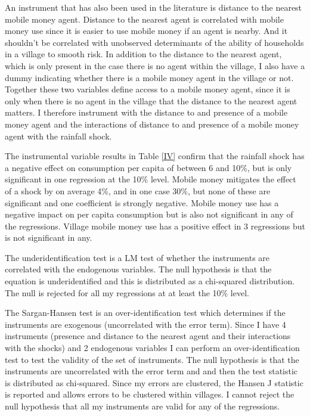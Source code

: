 An instrument that has also been used in the literature is distance to the nearest mobile money agent. Distance to the nearest agent is correlated with mobile money use since it is easier to use mobile money if an agent is nearby. And it shouldn't be correlated with unobserved determinants of the ability of households in a village to smooth risk. In addition to the distance to the nearest agent, which is only present in the case there is no agent within the village, I also have a dummy indicating whether there is a mobile money agent in the village or not. Together these two variables define access to a mobile money agent, since it is only when there is no agent in the village that the distance to the nearest agent matters.   I therefore instrument with the distance to and presence of a mobile money agent and the interactions of distance to and presence of a mobile money agent with the rainfall shock. 



The instrumental variable results in Table \ref{IV} confirm that the rainfall shock has a  negative effect on consumption per capita of between 6 and 10\%, but is only significant in one regression at the 10\% level. Mobile money mitigates the effect of a shock by on average 4\%, and in one case 30\%, but none of these are significant and one coefficient is strongly negative. Mobile money use has a negative impact on per capita consumption  but is also not significant in any of the regressions. Village mobile money use has a positive effect in 3 regressions but is not significant in any. 


The underidentification test is a LM test of whether the instruments are correlated with the endogenous variables. The null hypothesis is that the equation is underidentified and this is distributed as a chi-squared distribution. The null is rejected for all my regressions at at least the 10\% level. 

The Sargan-Hansen test is an over-identification test which determines if the instruments are exogenous (uncorrelated with the error term). Since I have 4 instruments (presence and distance to the nearest agent and their interactions with the shocks) and 2 endogenous variables I can perform an over-identification test to test the validity of the set of instruments. The null hypothesis is that the instruments are uncorrelated with the error term and and then the test statistic is distributed as chi-squared. Since my errors are clustered, the Hansen J statistic is reported and allows errors to be clustered within villages. I cannot reject the null hypothesis that all my instruments are valid for any of the regressions. 

